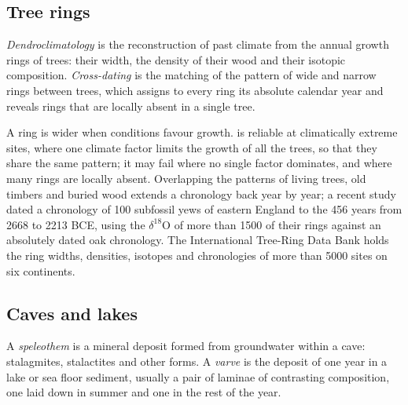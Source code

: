 \subsection*{Tree rings}

\begin{definition}\label{def:b2:climate-proxies:dendro}
\emph{Dendroclimatology} is the reconstruction of past climate from the
annual growth rings of trees: their width, the density of their wood and their isotopic
composition. \emph{Cross-dating} is the matching of the pattern of wide and
narrow rings between trees, which assigns to every ring its absolute calendar year and reveals
rings that are locally absent in a single tree.
\end{definition}

A ring is wider when conditions favour growth.  is reliable at climatically extreme sites, where one
climate factor limits the growth of all the trees, so that they share the same pattern; it may
fail where no single factor dominates, and where many rings are locally absent.
Overlapping the patterns of living trees, old timbers and buried wood extends a chronology back
year by year; a recent study dated a chronology of 100 subfossil yews of eastern England to the
456 years from 2668 to 2213 BCE, using the $\delta^{18}$O of more than \num{1500} of their rings
against an absolutely dated oak chronology. The International Tree-Ring Data Bank holds the ring
widths, densities, isotopes and chronologies of more than \num{5000} sites on six continents.

\subsection*{Caves and lakes}

\begin{definition}\label{def:b2:climate-proxies:archives}
A \emph{speleothem} is a mineral deposit formed from groundwater within a
cave: stalagmites, stalactites and other forms. A \emph{varve} is
the deposit of one year in a lake or sea floor sediment, usually a pair of laminae of contrasting
composition, one laid down in summer and one in the rest of the year.
\end{definition}

